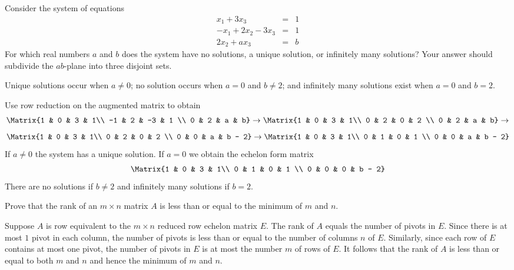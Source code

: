 \documentclass{article}
\begin{document}
\begin{exercise}\label{c2.4.2b.2}

Consider the system of equations
\[
\begin{array}{rcl}
x_1 + 3x_3 & = & 1 \\
-x_1+2x_2-3x_3 & = & 1\\
2x_2 + ax_3 & = & b
\end{array}
\]
For which real numbers $a$ and $b$ does the system have no solutions, a unique solution, or infinitely many solutions?  Your answer should subdivide the $ab$-plane into three disjoint sets.
  
\begin{solution}

\ans Unique solutions occur when $a\neq 0$; no solution occurs when $a=0$ and $b\neq 2$; and infinitely many solutions exist when $a = 0$ and $b =2$.

\soln 
Use row reduction on the augmented matrix to obtain
\[
\Matrix{1 & 0 & 3 & 1\\ -1 & 2 & -3 & 1 \\ 0 & 2 & a & b} \to
\Matrix{1 & 0 & 3 & 1\\  0 & 2 & 0 & 2 \\ 0 & 2 & a & b} \to
\]
\[
\Matrix{1 & 0 & 3 & 1\\  0 & 2 & 0 & 2 \\ 0 & 0 & a & b - 2} \to
\Matrix{1 & 0 & 3 & 1\\  0 & 1 & 0 & 1 \\ 0 & 0 & a & b - 2} 
\]
If $a\neq 0$ the system has a unique solution. If $a = 0$ we obtain the echelon form matrix
\[
\Matrix{1 & 0 & 3 & 1\\  0 & 1 & 0 & 1 \\ 0 & 0 & 0 & b - 2}
\]  
There are no solutions if $b\neq 2$ and infinitely many solutions if $b = 2$.

\end{solution}
\end{exercise}

\problemlabel

\begin{exercise} \label{A:2.4.1}
  Prove that the rank of an $m \times n$ matrix $A$ is less than or equal to
  the minimum of $m$ and $n$.

\begin{solution}
Suppose $A$ is row equivalent to the $m \times n$ reduced row echelon matrix $E$.  The rank of $A$ equals the number of pivots in $E$. Since there is at most $1$ pivot in each column, the number of pivots is less than or equal to the number of columns $n$ of $E$.  Similarly, since each row of $E$ contains at most one pivot, the number of pivots in $E$ is at most the number $m$ of rows of $E$.  It follows that the rank of $A$ is less than or equal to both $m$ and $n$ and hence the minimum of $m$ and $n$.  
\end{solution}
\end{exercise}
\end{document}
